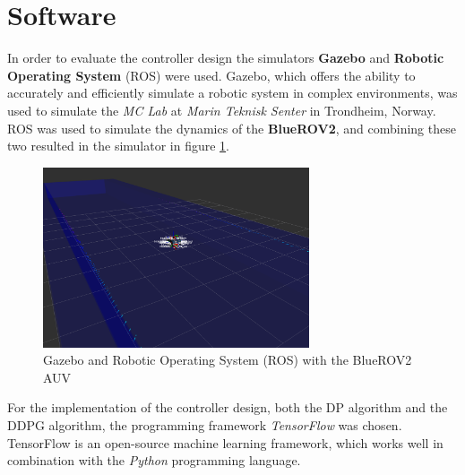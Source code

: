 \section{Software}
In order to evaluate the controller design the simulators \textbf{Gazebo} and \textbf{Robotic Operating System} (ROS) were used. Gazebo, which offers the ability to accurately and efficiently simulate a robotic system in complex environments, was used to simulate the \textit{MC Lab} at \textit{Marin Teknisk Senter} in Trondheim, Norway. ROS was used to simulate the dynamics of the \textbf{BlueROV2}, and combining these two resulted in the simulator in figure \ref{fig:ros}. 
\begin{figure}[H]
    \centering
    \includegraphics[width=0.7\textwidth]{images/chap4/ROS.png}
    \caption{Gazebo and Robotic Operating System (ROS) with the BlueROV2 AUV}
    \label{fig:ros}
\end{figure}
For the implementation of the controller design, both the DP algorithm and the DDPG algorithm, the programming framework \textit{TensorFlow} was chosen. TensorFlow is an open-source machine learning framework, which works well in combination with the \textit{Python} programming language. 
